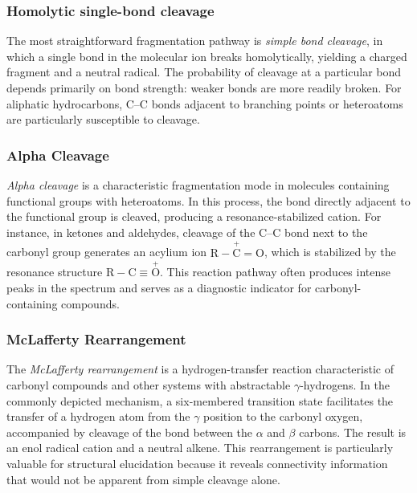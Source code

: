 \subsubsection{Homolytic single-bond cleavage}

The most straightforward fragmentation pathway is \emph{simple bond cleavage}, in which a single bond in the molecular ion breaks homolytically, yielding a charged fragment and a neutral radical. 
The probability of cleavage at a particular bond depends primarily on bond strength: weaker bonds are more readily broken. \cite[p.~30]{Gross2006}
For aliphatic hydrocarbons, C--C bonds adjacent to branching points or heteroatoms are particularly susceptible to cleavage. \cite[p.~258]{Gross2006}

\subsubsection{Alpha Cleavage} 

\emph{Alpha cleavage} is a characteristic fragmentation mode in molecules containing functional groups with heteroatoms. \cite[pp.~220--221]{Dass2007}
In this process, the bond directly adjacent to the functional group is cleaved, producing a resonance-stabilized cation. \cite[pp.~220--221]{Dass2007}
For instance, in ketones and aldehydes, cleavage of the C--C bond next to the carbonyl group generates an acylium ion $\mathrm{R{-}\overset{+}{C}{=}O}$, which is stabilized by the resonance structure $\mathrm{R{-}C{\equiv}\overset{+}{O}}$. \cite[p.~230]{Gross2006}
This reaction pathway often produces intense peaks in the spectrum and serves as a diagnostic indicator for carbonyl-containing compounds. \cite[pp.~234--235]{Gross2006}

\subsubsection{McLafferty Rearrangement}

The \emph{McLafferty rearrangement} is a hydrogen-transfer reaction characteristic of carbonyl compounds and other systems with abstractable $\gamma$-hydrogens.\cite[p.~223]{Dass2007}
In the commonly depicted mechanism, a six-membered transition state facilitates the transfer of a hydrogen atom from the $\gamma$ position to the carbonyl oxygen, accompanied by cleavage of the bond between the $\alpha$ and $\beta$ carbons. \cite[p.~265]{Gross2006}
The result is an enol radical cation and a neutral alkene. \cite[p.~224]{Dass2007}
This rearrangement is particularly valuable for structural elucidation because it reveals connectivity information that would not be apparent from simple cleavage alone. 
\cite[p.~224]{Dass2007}


